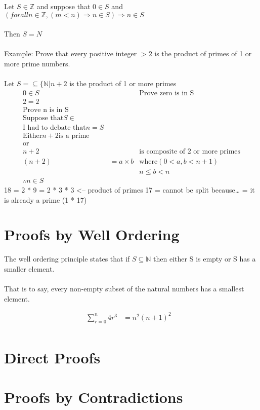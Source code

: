 Let $S \in \mathbb{Z}$ and suppose that $0 \in S$ and $(forall n \in \mathbb{Z}, (m < n) \Rightarrow n \in S) \Rightarrow n \in S$ \\
\\
Then $S = N$ \\
\\
Example: Prove that every positive integer $> 2$ is the product of primes of 1
or more prime numbers.\\
\\
Let $S = \subseteq \{ \mathbb{N} | n+2$ is the product of 1 or more primes
\begin{align}
  0 \in S && \text{Prove zero is in S}\\
  2 = 2 && \\
  \text{Prove n is in S} && \\
  \text{Suppose that} S \in && \\
  \text{I had to debate that} n = S && \\
  \text{Either} n + 2 \text{is a prime} && \\
  \text{or} && \\
  n + 2 && \text{is composite of 2 or more primes} \\
  (n + 2) & = a \times b & \text{where} (0 < a, b < n+1) \\
  && n \leq b < n \\
  \therefore n \in S &&
\end{align}
18 = 2 * 9
   = 2 * 3 * 3 <-- product of primes
17 = cannot be split because\ldots
   = it is already a prime (1 * 17)

\section{Proofs by Well Ordering}
\label{sec:WellOrdering}
The well ordering principle states that if $S \subseteq \mathbb{N}$ then
either S is empty or S has a smaller element.\\
\\
That is to say, every non-empty subset of the natural numbers has a smallest
element.

\begin{align}
  \sum_{r=0}^{n} 4r^{3} & = n^{2}(n+1)^{2} & \\
\end{align}

\section{Direct Proofs}
\label{sec:DirectProofs}

\section{Proofs by Contradictions}
\label{sec:ProofsByContradictions}